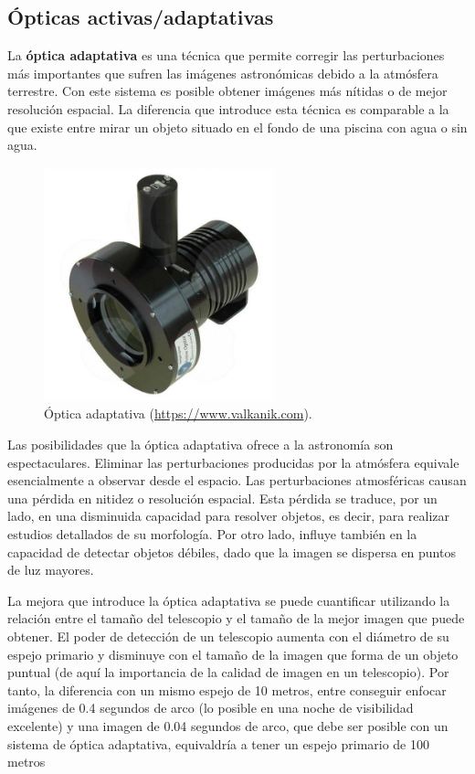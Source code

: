 \subsection{Ópticas activas/adaptativas}

La \textbf{óptica adaptativa} es una técnica que permite corregir las perturbaciones más importantes que sufren las imágenes astronómicas debido a la atmósfera terrestre. Con este sistema es posible obtener imágenes más nítidas o de mejor resolución espacial. La diferencia que introduce esta técnica es comparable a la que existe entre mirar un objeto situado en el fondo de una piscina con agua o sin agua.

\bigskip
\begin{figure}[!ht]
  \begin{center}
  \includegraphics[width=0.6\textwidth]{../images/optica.jpg}
  \caption{Óptica adaptativa (\href{https://www.valkanik.com}{https://www.valkanik.com}).}
  \label{fig:diag_scrum}
  \end{center}
\end{figure}


\bigskip
Las posibilidades que la óptica adaptativa ofrece a la astronomía son espectaculares. Eliminar las perturbaciones producidas por la atmósfera equivale esencialmente a observar desde el espacio. Las perturbaciones atmosféricas causan una pérdida en nitidez o resolución espacial. Esta pérdida se traduce, por un lado, en una disminuida capacidad para resolver objetos, es decir, para realizar estudios detallados de su morfología. Por otro lado, influye también en la capacidad de detectar objetos débiles, dado que la imagen se dispersa en puntos de luz mayores.\cite{OA}

\bigskip
La mejora que introduce la óptica adaptativa se puede cuantificar utilizando la relación entre el tamaño del telescopio y el tamaño de la mejor imagen que puede obtener. El poder de detección de un telescopio aumenta con el diámetro de su espejo primario y disminuye con el tamaño de la imagen que forma de un objeto puntual (de aquí la importancia de la calidad de imagen en un telescopio). Por tanto, la diferencia con un mismo espejo de 10 metros, entre conseguir enfocar imágenes de 0.4 segundos de arco (lo posible en una noche de visibilidad excelente) y una imagen de 0.04 segundos de arco, que debe ser posible con un sistema de óptica adaptativa, equivaldría a tener un espejo primario de 100 metros

